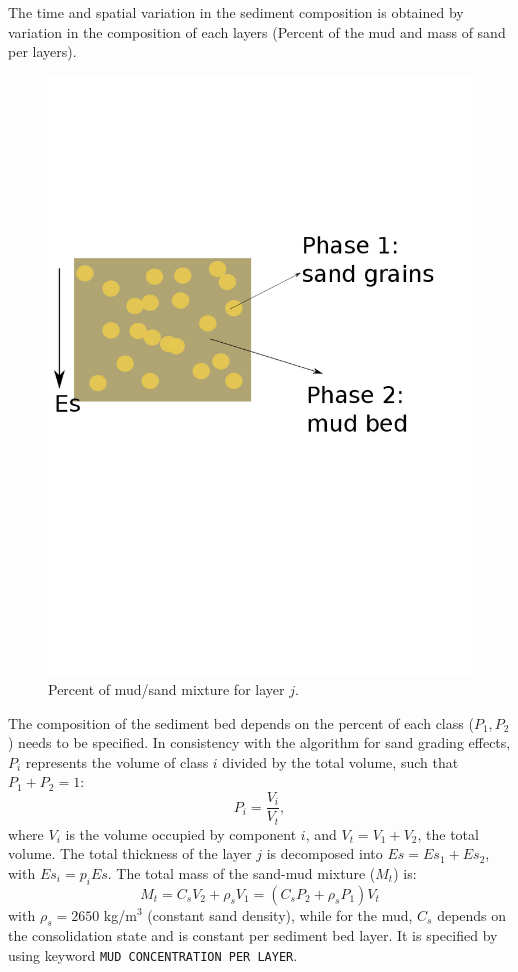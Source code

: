 The time and spatial variation in the sediment composition is obtained by
variation in the composition of each layers (Percent of the mud and mass of
sand per layers). 

\begin{figure}[H]
\begin{center}
\includegraphics[scale=0.3,angle=0]{graphics/mudsand_1.png}
\caption{Percent of mud/sand mixture for layer $j$.}\label{fig:mudsand1}
\end{center}
\end{figure}

The composition of the sediment bed depends on the percent of each class ($P_1, P_2$) needs to be specified. In consistency with the algorithm for sand grading effects, $P_i$ represents the volume of class $i$ divided by
the total volume, such that $P_1+P_2 =1$:
\begin{equation*}
P_i = \frac{V_i}{V_t}, 
\end{equation*}
where $V_i$ is the volume occupied by component $i$, and $V_t=V_1+V_2$, the total volume. The total thickness of the layer $j$ is decomposed into $Es= Es_1 + Es_2$, with $Es_i = p_i Es$. The total mass of the sand-mud mixture ($M_t$) is:
\begin{equation*}
M_{t} =C_{s} V_{2} +\rho _{s} V_{1} =\left( C_{s} P_{2} +\rho _{s} P_{1}
\right) V_{t} 
\end{equation*}
with $\rho_s = 2650$ kg/m$^{3}$ (constant sand density), while
for the mud, $C_s$ depends on the consolidation state and is constant per
sediment bed layer. It is specified by using keyword \texttt{MUD CONCENTRATION PER
LAYER}.

